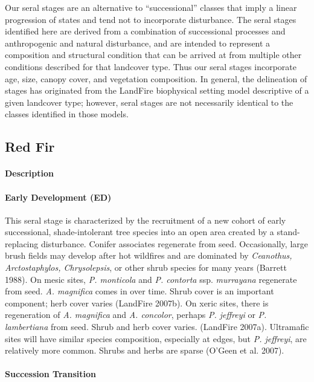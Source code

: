 Our seral stages are an alternative to ``successional'' classes that imply a linear progression of states and tend not to incorporate disturbance. The seral stages identified here are derived from a combination of successional processes and anthropogenic and natural disturbance, and are intended to represent a composition and structural condition that can be arrived at from multiple other conditions described for that landcover type. Thus our seral stages incorporate age, size, canopy cover, and vegetation composition. In general, the delineation of stages has originated from the LandFire biophysical setting model descriptive of a given landcover type; however, seral stages are not necessarily identical to the classes identified in those models.

\subsection*{Red Fir}

\paragraph{Description}
\paragraph{Early Development (ED)} This seral stage is characterized by the recruitment of a new cohort of early successional, shade-intolerant tree species into an open area created by a stand-replacing disturbance. Conifer associates regenerate from seed. Occasionally, large brush fields may develop after hot wildfires and are dominated by \emph{Ceanothus, Arctostaphylos, Chrysolepsis}, or other shrub species for many years (Barrett 1988). On mesic sites, \emph{P. monticola} and \emph{P. contorta} ssp. \emph{murrayana} regenerate from seed. \emph{A. magnifica} comes in over time. Shrub cover is an important component; herb cover varies (LandFire 2007b). On xeric sites, there is regeneration of \emph{A. magnifica} and \emph{A. concolor}, perhaps \emph{P. jeffreyi} or \emph{P. lambertiana} from seed. Shrub and herb cover varies. (LandFire 2007a). Ultramafic sites will have similar species composition, especially at edges, but \emph{P. jeffreyi}, are relatively more common. Shrubs and herbs are sparse (O’Geen et al. 2007).

\paragraph{Succession Transition}


